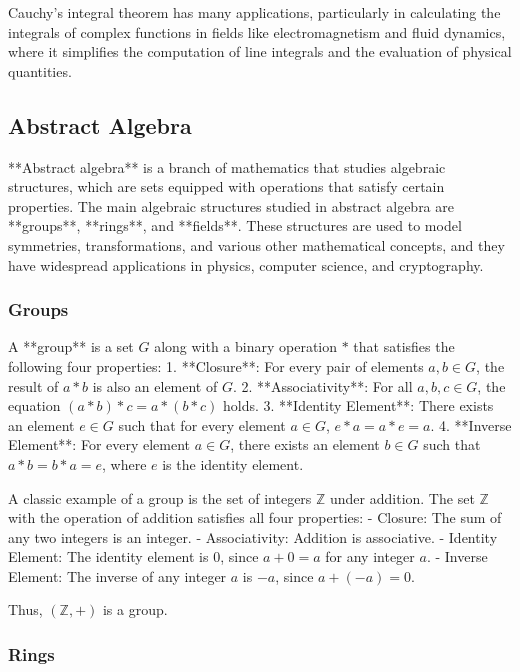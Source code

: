 \documentclass{article}
\begin{document}
Cauchy's integral theorem has many applications, particularly in calculating the integrals of complex functions in fields like electromagnetism and fluid dynamics, where it simplifies the computation of line integrals and the evaluation of physical quantities.


\subsection{Abstract Algebra}

**Abstract algebra** is a branch of mathematics that studies algebraic structures, which are sets equipped with operations that satisfy certain properties. The main algebraic structures studied in abstract algebra are **groups**, **rings**, and **fields**. These structures are used to model symmetries, transformations, and various other mathematical concepts, and they have widespread applications in physics, computer science, and cryptography.

\subsubsection*{Groups}

A **group** is a set \( G \) along with a binary operation \( * \) that satisfies the following four properties:
1. **Closure**: For every pair of elements \( a, b \in G \), the result of \( a * b \) is also an element of \( G \).
2. **Associativity**: For all \( a, b, c \in G \), the equation \( (a * b) * c = a * (b * c) \) holds.
3. **Identity Element**: There exists an element \( e \in G \) such that for every element \( a \in G \), \( e * a = a * e = a \).
4. **Inverse Element**: For every element \( a \in G \), there exists an element \( b \in G \) such that \( a * b = b * a = e \), where \( e \) is the identity element.

A classic example of a group is the set of integers \( \mathbb{Z} \) under addition. The set \( \mathbb{Z} \) with the operation of addition satisfies all four properties:
- Closure: The sum of any two integers is an integer.
- Associativity: Addition is associative.
- Identity Element: The identity element is \( 0 \), since \( a + 0 = a \) for any integer \( a \).
- Inverse Element: The inverse of any integer \( a \) is \( -a \), since \( a + (-a) = 0 \).

Thus, \( (\mathbb{Z}, +) \) is a group.

\subsubsection*{Rings}
\end{document}
